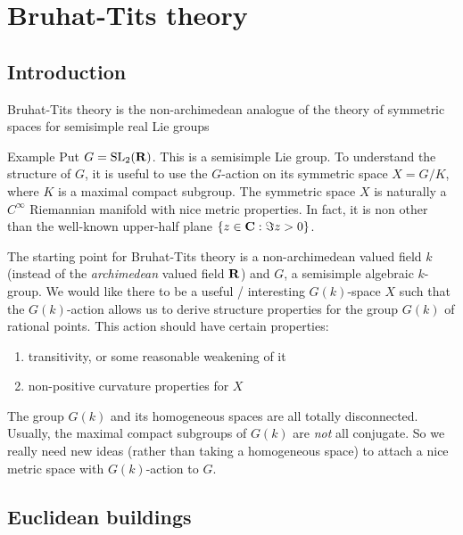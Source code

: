 




\section{Bruhat-Tits theory}





\subsection{Introduction}

Bruhat-Tits theory is the non-archimedean analogue of the theory of symmetric 
spaces for semisimple real Lie groups 

\begin{enonce}[remark]{Example}
Put $G=\operatorname{SL}_2(\mathbf{R})$. This is a semisimple Lie group. To understand the 
structure of $G$, it is useful to use the $G$-action on its symmetric space 
$X=G/K$, where $K$ is a maximal compact subgroup. The symmetric space $X$ is 
naturally a $C^\infty$ Riemannian manifold with nice metric properties. In 
fact, it is non other than the well-known upper-half plane 
$\{z\in \mathbf{C}:\Im z>0\}$. 
\end{enonce}

The starting point for Bruhat-Tits theory is a non-archimedean valued field $k$ 
(instead of the \emph{archimedean} valued field $\mathbf{R}$) and $G$, a semisimple 
algebraic $k$-group. We would like there to be a useful / interesting 
$G(k)$-space $X$ such that the $G(k)$-action allows us to derive structure 
properties for the group $G(k)$ of rational points. This action should have 
certain properties:
\begin{enumerate}
  \item transitivity, or some reasonable weakening of it 
  \item non-positive curvature properties for $X$
\end{enumerate}

The group $G(k)$ and its homogeneous spaces are all totally disconnected. 
Usually, the maximal compact subgroups of $G(k)$ are \emph{not} all conjugate. 
So we really need new ideas (rather than taking a homogeneous space) to attach 
a nice metric space with $G(k)$-action to $G$. 





\subsection{Euclidean buildings}


